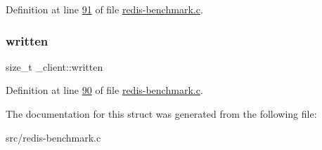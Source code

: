 Definition at line \hyperlink{redis-benchmark_8c_source_l00091}{91} of file \hyperlink{redis-benchmark_8c_source}{redis-\/benchmark.\+c}.

\mbox{\label{struct__client_a09708e74a9931a2fd4fc74192c1e6c45}} 
\subsubsection{\texorpdfstring{written}{written}}
{\footnotesize\ttfamily size\+\_\+t \+\_\+client\+::written}



Definition at line \hyperlink{redis-benchmark_8c_source_l00090}{90} of file \hyperlink{redis-benchmark_8c_source}{redis-\/benchmark.\+c}.



The documentation for this struct was generated from the following file\+:\begin{DoxyCompactItemize}
\item 
src/redis-\/benchmark.\+c\end{DoxyCompactItemize}
